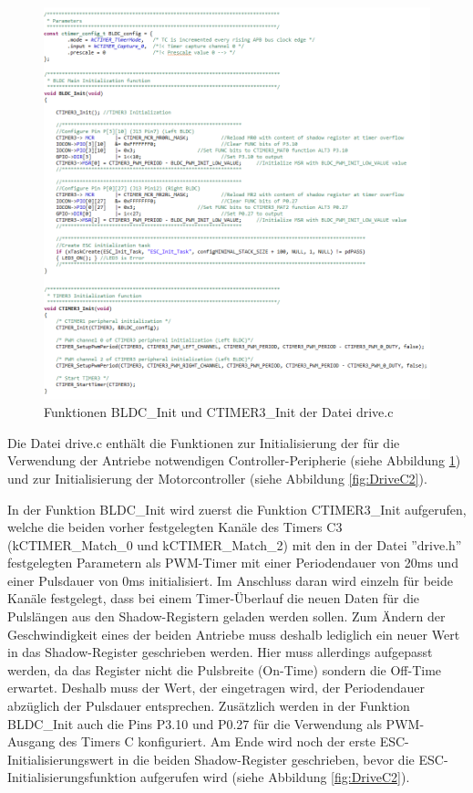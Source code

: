 \begin{figure}[H] %
\includegraphics[width=.95\textwidth]{sec4/images/DriveC1} 
\centering
\captionsetup{width=.95\textwidth}
\caption[Funktionen BLDC\_Init und CTIMER3\_Init der Datei \glqq{}drive.c\grqq{}]{Funktionen BLDC\_Init und CTIMER3\_Init der Datei \glqq{}drive.c\grqq{}}\centering
\label{fig:DriveC1}
\end{figure}

Die Datei \glqq{}drive.c\grqq{} enthält die Funktionen zur Initialisierung der für die Verwendung der Antriebe notwendigen Controller-Peripherie (siehe Abbildung \ref{fig:DriveC1}) und zur Initialisierung der Motorcontroller (siehe Abbildung \ref{fig:DriveC2}).\vspace{11pt}

In der Funktion BLDC\_Init wird zuerst die Funktion CTIMER3\_Init aufgerufen, welche die beiden vorher festgelegten Kanäle des Timers C3 (\glqq{}kCTIMER\_Match\_0\grqq{} und \glqq{}kCTIMER\_Match\_2\grqq{}) mit den in der Datei ''drive.h'' festgelegten Parametern als \ac{PWM}-Timer mit einer Periodendauer von 20ms und einer Pulsdauer von 0ms initialisiert. Im Anschluss daran wird einzeln für beide Kanäle festgelegt, dass bei einem Timer-Überlauf die neuen Daten für die Pulslängen aus den Shadow-Registern geladen werden sollen. Zum Ändern der Geschwindigkeit eines der beiden Antriebe muss deshalb lediglich ein neuer Wert in das Shadow-Register geschrieben werden. Hier muss allerdings aufgepasst werden, da das Register nicht die Pulsbreite (On-Time) sondern die Off-Time erwartet. Deshalb muss der Wert, der eingetragen wird, der Periodendauer abzüglich der Pulsdauer entsprechen. Zusätzlich werden in der Funktion BLDC\_Init auch die Pins P3.10 und P0.27 für die Verwendung als \ac{PWM}-Ausgang des Timers C konfiguriert. Am Ende wird noch der erste \ac{ESC}-Initialisierungswert in die beiden Shadow-Register geschrieben, bevor die \ac{ESC}-Initialisierungsfunktion aufgerufen wird (siehe Abbildung \ref{fig:DriveC2}).

